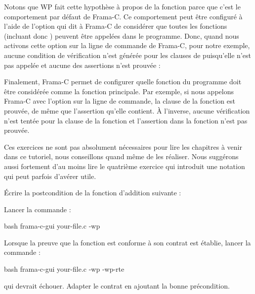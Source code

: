 

Notons que WP fait cette hypothèse à propos de la fonction 
parce que c'est le comportement par défaut de Frama-C. Ce comportement peut être
configuré à l'aide de l'option  qui dit à Frama-C de
considérer que toutes les fonctions (incluant donc ) peuvent
être appelées dans le programme. Donc, quand nous activons cette option sur la
ligne de commande de Frama-C, pour notre exemple, aucune condition de
vérification n'est générée pour les clauses  de
 puisqu'elle n'est pas appelée et aucune des assertions n'est
prouvée :




Finalement, Frama-C permet de configurer quelle fonction du programme doit être
considérée comme la fonction principale. Par exemple, si nous appelons Frama-C
avec l'option  sur la ligne de commande, la clause
 de la fonction  est prouvée, de même que
l'assertion qu'elle contient. À l'inverse, aucune vérification n'est tentée
pour la clause  de la fonction  et
l'assertion dans la fonction  n'est pas prouvée.






Ces exercices ne sont pas absolument nécessaires pour lire les chapitres à
venir dans ce tutoriel, nous conseillons quand même de les réaliser. Nous
suggérons aussi fortement d'au moins lire le quatrième exercice qui introduit
une notation qui peut parfois d'avérer utile.




Écrire la postcondition de la fonction d'addition suivante :




Lancer la commande :

\begin{CodeBlock}{bash}
frama-c-gui your-file.c -wp
\end{CodeBlock}


Lorsque la preuve que la fonction est conforme à son contrat est établie, lancer
la commande :
\begin{CodeBlock}{bash}
frama-c-gui your-file.c -wp -wp-rte
\end{CodeBlock}
qui devrait échouer. Adapter le contrat en ajoutant la bonne précondition.


